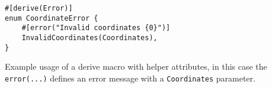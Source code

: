 \begin{listing}
    \centering
    \begin{verbatim}
#[derive(Error)]
enum CoordinateError {
    #[error("Invalid coordinates {0}")]
    InvalidCoordinates(Coordinates),
}
    \end{verbatim}
    \caption{
        Example usage of a derive macro with helper attributes,
        in this case the \texttt{error(...)} defines an error message with a \texttt{Coordinates} parameter.
    }
    \label{lst:rust-derive-error}
\end{listing}